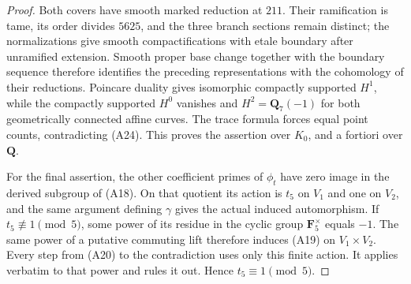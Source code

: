 \documentclass[11pt,oneside]{article}
\begin{document}
\begin{proof}
Both covers have smooth marked reduction at $211$.
Their ramification is tame, its order divides $5625$,
and the three branch sections remain distinct; the
normalizations give smooth compactifications with etale
boundary after unramified extension. Smooth proper base
change together with the boundary sequence therefore
identifies the preceding representations with the
cohomology of their reductions. Poincare duality gives
isomorphic compactly supported $H^1$, while the compactly
supported $H^0$ vanishes and $H^2=\mathbf Q_7(-1)$ for
both geometrically connected affine curves. The trace
formula forces equal point counts, contradicting (A24).
This proves the assertion over $K_0$, and a fortiori
over $\mathbf Q$.

For the final assertion, the other coefficient primes of
$\phi_t$ have zero image in the derived subgroup of (A18).
On that quotient its action is $t_5$ on $V_1$ and one on
$V_2$, and the same argument defining $\gamma$ gives the
actual induced automorphism. If $t_5\not\equiv1\pmod5$,
some power of its residue in the cyclic group
$\mathbf F_5^\times$ equals $-1$. The same power of a
putative commuting lift therefore induces (A19) on
$V_1\times V_2$. Every step from (A20) to the contradiction
uses only this finite action. It applies verbatim to that
power and rules it out. Hence $t_5\equiv1\pmod5$.
\end{proof}
\end{document}
